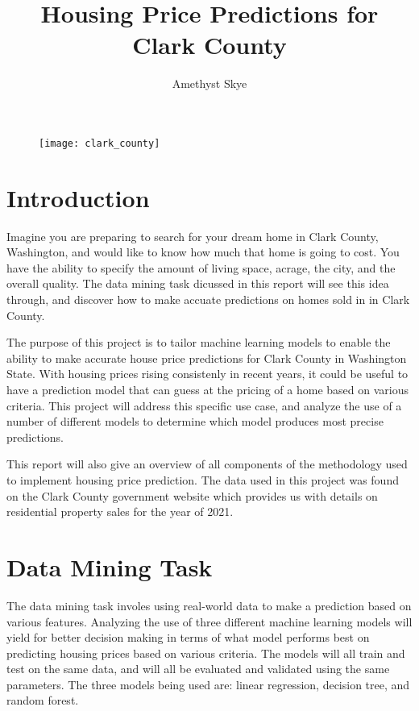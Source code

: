 \documentclass[12pt]{article}
\author{Amethyst Skye}
\title{\textbf{Housing Price Predictions for Clark County}}
\begin{document}
\graphicspath{ {/home/amskyepi/Documents/Fall2022/CS315/Final_Project/Visuals/Report} }
\maketitle
\begin{figure}[h]
    \texttt{[image: clark\_county]}
\end{figure}
\newpage

\tableofcontents
\newpage

\section{Introduction}
    Imagine you are preparing to search for your dream home in Clark County, Washington, and would 
    like to know how much that home is going to cost. You have the ability to specify the amount of 
    living space, acrage, the city, and the overall quality. The data mining task dicussed in this 
    report will see this idea through, and discover how to make accuate predictions on homes sold in 
    in Clark County.

    The purpose of this project is to tailor machine learning models to enable the ability to make 
    accurate house price predictions for Clark County in Washington State. 
    With housing prices rising consistenly in recent years, it could be useful to have a 
    prediction model that can guess at the pricing of a home based on various 
    criteria. This project will address this specific use case, and analyze the use of a number of 
    different models to determine which model produces most precise predictions.

    This report will also give an overview of all components of the methodology used to implement housing 
    price prediction. The data \cite{cc_data} used in this project was found on the Clark County government website
    which provides us with details on residential property sales for the year of 2021. 

\section{Data Mining Task}
    The data mining task involes using real-world data to make a prediction based on various features. 
    Analyzing the use of three different machine learning models will yield for better decision making 
    in terms of what model performs best on predicting housing prices based on various criteria. The models
    will all train and test on the same data, and will all be evaluated and validated using the same parameters. 
    The three models being used are: linear regression, decision tree, and random forest. 
\end{document}
